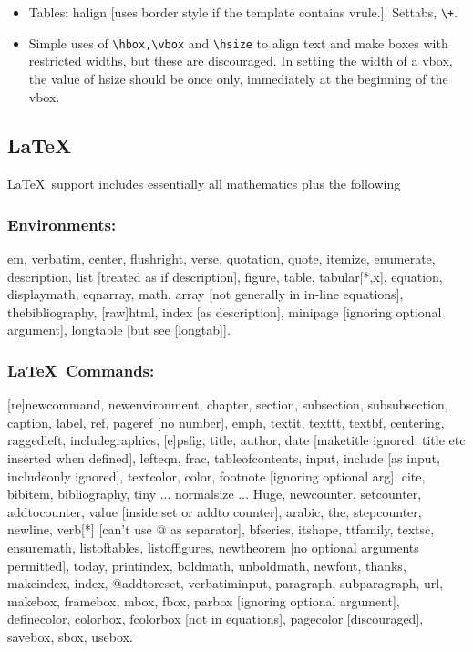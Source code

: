 \documentclass[12pt]{article}
\begin{document}
\begin{itemize}
\item Tables: halign [uses border style if the template contains
vrule.]. Settabs, \verb|\+|.

\item Simple uses of \verb!\hbox,\vbox! and \verb!\hsize! to align text and
make boxes with restricted widths, but these are discouraged. In
setting the width of a vbox, the value of hsize should be once only,
immediately at the beginning of the vbox.

\end{itemize}


\subsection{\LaTeX}
\LaTeX\ support includes essentially all mathematics plus the following 

\subsubsection{Environments:}
 em, verbatim, center, flushright, verse, quotation, quote, itemize,
enumerate, description, list [treated as if description], figure,
table, tabular[*,x], equation, displaymath, eqnarray, math, array [not
generally in in-line equations], thebibliography, [raw]html,
index [as description], minipage [ignoring optional argument],
longtable [but see \ref{longtab}].

\subsubsection{\LaTeX\ Commands:}
 [re]newcommand, newenvironment, chapter, section, subsection,
subsubsection, caption, label, ref, pageref [no number], emph, textit,
texttt, textbf, centering, raggedleft, includegraphics, [e]psfig,
title, author, date [maketitle ignored: title etc inserted when
defined], lefteqn, frac, tableofcontents, input, include [as input,
includeonly ignored], textcolor, color, footnote
[ignoring optional arg], cite, bibitem, bibliography, tiny
... normalsize ... Huge, newcounter, setcounter, addtocounter, value
[inside set or addto counter], arabic, the, stepcounter, newline,
verb[*] [can't use @ as separator], bfseries, itshape, ttfamily,
textsc, ensuremath, listoftables, listoffigures, newtheorem [no
optional arguments permitted], today, printindex, boldmath,
unboldmath, newfont, thanks, makeindex, index, @addtoreset,
verbatiminput, paragraph, subparagraph, url, makebox, framebox, mbox,
fbox, parbox [ignoring optional argument], definecolor, colorbox,
fcolorbox [not in equations], pagecolor [discouraged], savebox, sbox,
usebox.
\end{document}
